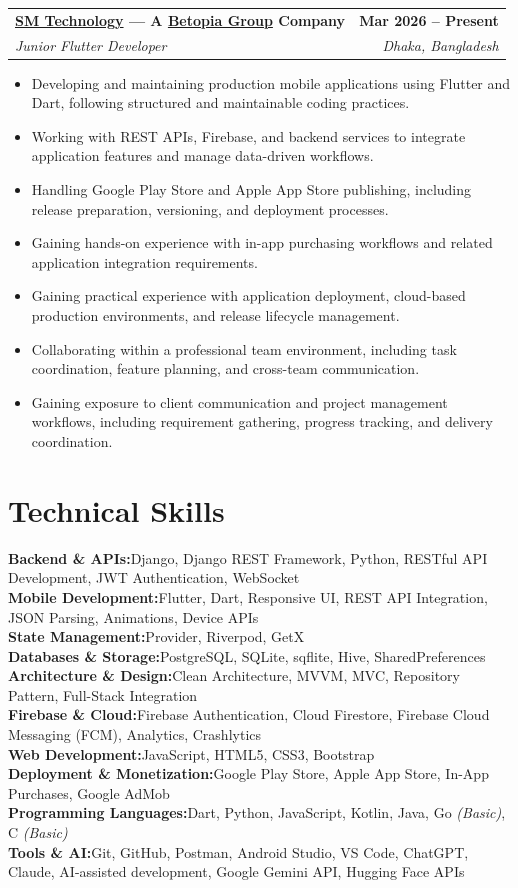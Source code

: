 \documentclass[10.5pt, a4paper]{article}
\makeatletter
\newcommand{\expentry}[4]{%
  \begin{tabularx}{\linewidth}{@{}X r@{}}
    \textbf{\large #1} & \textbf{\small\color{cnavy}#2} \\[1pt]
    \textit{\color{csteel}#3} & \textit{\small\color{csteel}#4}
  \end{tabularx}%
}
\newcommand{\skillrow}[2]{%
  {\textbf{\color{cnavy}#1:}}\enskip\small #2 \\[3pt]%
}
\makeatother
\begin{document}
\expentry{\href{https://smtech24.com/}{SM Technology} --- A \href{https://betopiagroup.com/}{Betopia Group} Company}{Mar 2026 -- Present}{Junior Flutter Developer}{Dhaka, Bangladesh}

\vspace{4pt}

\begin{itemize}
  \item Developing and maintaining production mobile applications using Flutter and Dart, following structured and maintainable coding practices.
  \item Working with REST APIs, Firebase, and backend services to integrate application features and manage data-driven workflows.
  \item Handling Google Play Store and Apple App Store publishing, including release preparation, versioning, and deployment processes.
  \item Gaining hands-on experience with in-app purchasing workflows and related application integration requirements.
  \item Gaining practical experience with application deployment, cloud-based production environments, and release lifecycle management.
  \item Collaborating within a professional team environment, including task coordination, feature planning, and cross-team communication.
  \item Gaining exposure to client communication and project management workflows, including requirement gathering, progress tracking, and delivery coordination.
\end{itemize}

\section{Technical Skills}

\vspace{2pt}
\skillrow{Backend \& APIs}{Django, Django REST Framework, Python, RESTful API Development, JWT Authentication, WebSocket}
\skillrow{Mobile Development}{Flutter, Dart, Responsive UI, REST API Integration, JSON Parsing, Animations, Device APIs}
\skillrow{State Management}{Provider, Riverpod, GetX}
\skillrow{Databases \& Storage}{PostgreSQL, SQLite, sqflite, Hive, SharedPreferences}
\skillrow{Architecture \& Design}{Clean Architecture, MVVM, MVC, Repository Pattern, Full-Stack Integration}
\skillrow{Firebase \& Cloud}{Firebase Authentication, Cloud Firestore, Firebase Cloud Messaging (FCM), Analytics, Crashlytics}
\skillrow{Web Development}{JavaScript, HTML5, CSS3, Bootstrap}
\skillrow{Deployment \& Monetization}{Google Play Store, Apple App Store, In-App Purchases, Google AdMob}
\skillrow{Programming Languages}{Dart, Python, JavaScript, Kotlin, Java, Go \textit{(Basic)}, C \textit{(Basic)}}
\skillrow{Tools \& AI}{Git, GitHub, Postman, Android Studio, VS Code, ChatGPT, Claude, AI-assisted development, Google Gemini API, Hugging Face APIs}
\end{document}
